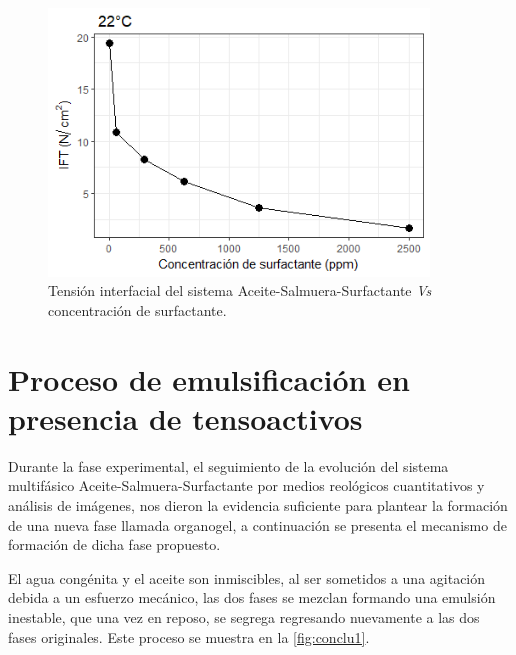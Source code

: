 \begin{figure}
    \centering
    \includegraphics[width=0.9\textwidth]{R_plot/Rplot26_cart.png}
    \caption[IFT del sistema A-S-S.]{Tensión interfacial del sistema Aceite-Salmuera-Surfactante \emph{Vs} concentración de surfactante.}
    \label{fig:IFTASS}
\end{figure}


\section{Proceso de emulsificación en presencia de tensoactivos}

Durante la fase experimental, el seguimiento de la evolución del sistema multifásico Aceite-Salmuera-Surfactante por medios reológicos cuantitativos y análisis de imágenes, nos dieron la evidencia suficiente para plantear la formación de una nueva fase llamada organogel, a continuación se presenta el mecanismo de formación de dicha fase propuesto.

El agua congénita y el aceite son inmiscibles, al ser sometidos a una agitación debida a un esfuerzo mecánico, las dos fases se mezclan formando una emulsión inestable, que una vez en reposo, se segrega regresando nuevamente a las dos fases originales. Este proceso se muestra en la \autoref{fig:conclu1}.

